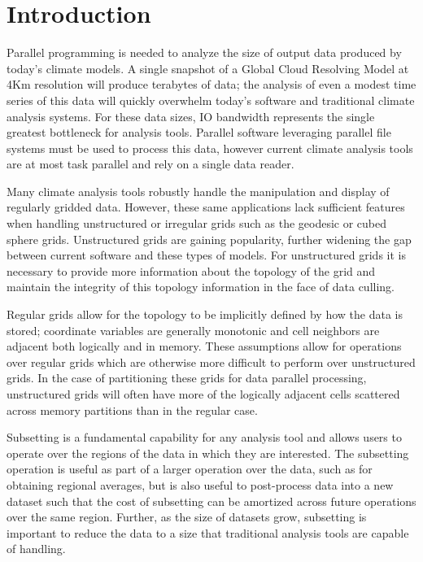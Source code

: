 \section{Introduction}
\label{section:introduction}

Parallel programming is needed to analyze the size of output data produced by
today's climate models\cite{MODSIM07:LOT}.  A single snapshot of a Global
Cloud Resolving Model at 4Km resolution will produce terabytes of
data\cite{GCRM}; the analysis of even a modest time series of this data will
quickly overwhelm today's software and traditional climate analysis systems.
For these data sizes, IO bandwidth represents the single greatest bottleneck
for analysis tools.  Parallel software leveraging parallel file systems must
be used to process this data, however current climate analysis tools are at
most task parallel and rely on a single data reader\cite{CDAT,CDO,NCO}.

Many climate analysis tools robustly handle the manipulation and display of
regularly gridded data.  However, these same applications lack sufficient
features when handling unstructured or irregular grids such as the
geodesic\cite{GEODESIC} or cubed sphere\cite{CUBE} grids.  Unstructured grids
are gaining popularity, further widening the gap between current software and
these types of models.  For unstructured grids it is necessary to provide more
information about the topology of the grid and maintain the integrity of this
topology information in the face of data culling.

Regular grids allow for the topology to be implicitly defined by how
the data is stored; coordinate variables are generally monotonic and cell
neighbors are adjacent both logically and in memory.  These assumptions allow
for operations over regular grids which are otherwise more difficult to
perform over unstructured grids.  In the case of partitioning these grids for
data parallel processing, unstructured grids will often have more of the
logically adjacent cells scattered across memory partitions than in the
regular case.

Subsetting is a fundamental capability for any analysis tool and allows users
to operate over the regions of the data in which they are interested.  The
subsetting operation is useful as part of a larger operation over the data,
such as for obtaining regional averages, but is also useful to post-process
data into a new dataset such that the cost of subsetting can be amortized
across future operations over the same region.  Further, as the size of
datasets grow, subsetting is important to reduce the data to a size that
traditional analysis tools are capable of handling. 


